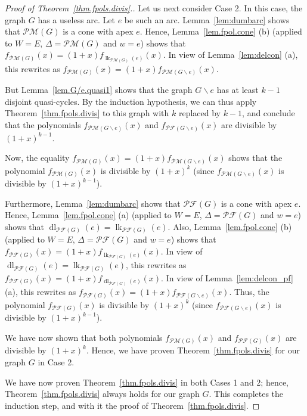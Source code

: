 \documentclass[12pt]{amsart}
\theoremstyle{definition}
\DeclareMathOperator{\lk}{lk}
\DeclareMathOperator{\dl}{dl}
\newcommand{\tup}[1]{\left( #1 \right)}
\newcommand{\Pm}[1]{\mathcal{PM}\left(#1\right)}
\newcommand{\Pf}[1]{\mathcal{PF}\left(#1\right)}
\begin{document}
\begin{proof}[Proof of Theorem~\ref{thm.fpols.divis}.]
Let us next consider Case 2.
In this case, the graph $G$ has a useless arc.
Let $e$ be such an arc.
Lemma~\ref{lem:dumbarc} shows that $\Pm{G}$ is a cone with apex $e$.
Hence, Lemma~\ref{lem.fpol.cone} (b)
(applied to $W = E$, $\Delta = \Pm{G}$ and $w = e$) shows that
$f_{\Pm{G}}\tup{x} = \tup{1+x} f_{\lk_{\Pm{G}}(e)}\tup{x}$.
In view of Lemma~\ref{lem:delcon} (a), this rewrites as
$f_{\Pm{G}}\tup{x} = \tup{1+x} f_{\Pm{G \backslash e}}\tup{x}$.

But Lemma~\ref{lem.G/e.quasi1} shows that the graph
$G \backslash e$ has at least $k-1$ disjoint quasi-cycles.
By the induction hypothesis, we can thus apply Theorem~\ref{thm.fpols.divis}
to this graph with $k$ replaced by $k-1$,
and conclude that 
the polynomials $f_{\Pm{G \backslash e}}\tup{x}$ and $f_{\Pf{G \backslash e}}\tup{x}$
are divisible by $\tup{1+x}^{k-1}$.

Now, the equality
$f_{\Pm{G}}\tup{x} = \tup{1+x} f_{\Pm{G \backslash e}}\tup{x}$
shows that the polynomial $f_{\Pm{G}}\tup{x}$ is divisible
by $\tup{1+x}^k$ (since $f_{\Pm{G \backslash e}}\tup{x}$
is divisible by $\tup{1+x}^{k-1}$).

Furthermore,
Lemma~\ref{lem:dumbarc} shows that $\Pf{G}$ is a cone with apex $e$.
Hence, Lemma~\ref{lem.fpol.cone} (a)
(applied to $W = E$, $\Delta = \Pf{G}$ and $w = e$) shows that
$\dl_{\Pf{G}}(e) = \lk_{\Pf{G}}(e)$.
Also, Lemma~\ref{lem.fpol.cone} (b)
(applied to $W = E$, $\Delta = \Pf{G}$ and $w = e$) shows that
$f_{\Pf{G}}\tup{x} = \tup{1+x} f_{\lk_{\Pf{G}}(e)}\tup{x}$.
In view of $\dl_{\Pf{G}}(e) = \lk_{\Pf{G}}(e)$, this rewrites as
$f_{\Pf{G}}\tup{x} = \tup{1+x} f_{\dl_{\Pf{G}}(e)}\tup{x}$.
In view of Lemma~\ref{lem:delcon_pf} (a), this rewrites as
$f_{\Pf{G}}\tup{x} = \tup{1+x} f_{\Pf{G \backslash e}}\tup{x}$.
Thus, the polynomial $f_{\Pf{G}}\tup{x}$ is divisible
by $\tup{1+x}^k$ (since $f_{\Pf{G \backslash e}}\tup{x}$
is divisible by $\tup{1+x}^{k-1}$).

We have now shown that both
polynomials $f_{\Pm{G}}\tup{x}$ and $f_{\Pf{G}}\tup{x}$ are divisible by $\tup{1+x}^k$.
Hence, we have proven Theorem~\ref{thm.fpols.divis} for our graph $G$
in Case 2.

We have now proven Theorem~\ref{thm.fpols.divis}
in both Cases 1 and 2; hence, Theorem~\ref{thm.fpols.divis} always
holds for our graph $G$.
This completes the induction step, and with it
the proof of Theorem~\ref{thm.fpols.divis}.
\end{proof}
\end{document}
